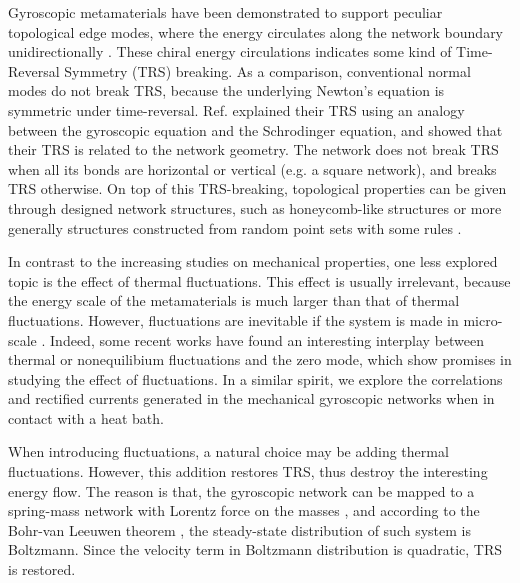 \documentclass[
 preprint,
 preprintnumbers,
 amsmath,amssymb,
 aps,
 pre,
 longbibliography,
 10pt, twocolumn
]{revtex4-1}
\begin{document}
Gyroscopic metamaterials have been demonstrated to support peculiar topological edge modes, where the energy circulates along the network boundary unidirectionally \cite{Nash2015TopologicalMetamaterials}. These chiral energy circulations indicates some kind of Time-Reversal Symmetry (TRS) breaking. As a comparison, conventional normal modes do not break TRS, because the underlying Newton's equation is symmetric under time-reversal. Ref. \cite{Nash2015TopologicalMetamaterials} explained their TRS using an analogy between the gyroscopic equation and the Schrodinger equation, and showed that their TRS is related to the network geometry. The network does not break TRS when all its bonds are horizontal or vertical (e.g. a square network), and breaks TRS otherwise.
On top of this TRS-breaking, topological properties can be given through designed network structures, such as honeycomb-like structures \cite{Nash2015TopologicalMetamaterials} or more generally structures constructed from random point sets with some rules \cite{Mitchell2018AmorphousSets}. 




In contrast to the increasing studies on mechanical properties, one less explored topic is the effect of thermal fluctuations. This effect is usually irrelevant, because the energy scale of the metamaterials is much larger than that of thermal fluctuations. However, fluctuations are inevitable if the system is made in micro-scale \cite{Blees2015GrapheneKirigami}. 
Indeed, some recent works have found an interesting interplay between thermal \cite{Rocklin2018FoldingTemperature,Pedro2018TopologicalInteractions} or nonequilibium \cite{Woodhouse2018AutonomousEquilibrium} fluctuations and the zero mode, which show promises in studying the effect of fluctuations.
In a similar spirit, we explore the correlations and rectified currents generated in the mechanical gyroscopic networks when in contact with a heat bath. 


When introducing fluctuations, a natural choice may be adding thermal fluctuations. However, this addition restores TRS, thus destroy the interesting energy flow. The reason is that, the gyroscopic network can be mapped to a spring-mass network with Lorentz force on the masses \cite{Lee2018TopologicalLaws}, and according to the Bohr-van Leeuwen theorem \cite{Pradhan2010NonexistenceSurface}, the steady-state distribution of such system is Boltzmann. Since the velocity term in Boltzmann distribution is quadratic, TRS is restored.
\end{document}

